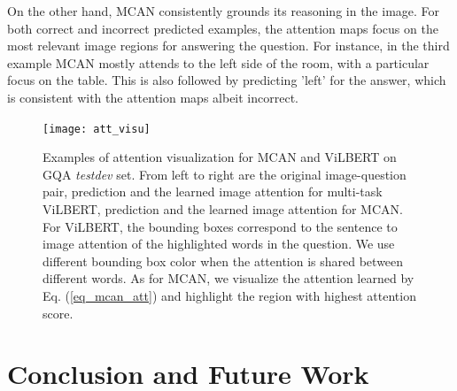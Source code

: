 \documentclass{article}
\begin{document}
On the other hand, MCAN consistently grounds its reasoning in the image. For both correct and incorrect predicted examples, the attention maps focus on the most relevant image regions for answering the question. For instance, in the third example MCAN mostly attends to the left side of the room, with a particular focus on the table. This is also followed by predicting 'left' for the answer, which is consistent with the attention maps albeit incorrect.

\begin{figure}[!ht]
	\centering
	\texttt{[image: att\_visu]}
	\caption{Examples of attention visualization for MCAN and ViLBERT on GQA \textit{testdev} set. From left to right are the original image-question pair, prediction and the learned image attention for multi-task ViLBERT, prediction and the learned image attention for MCAN. For ViLBERT, the bounding boxes correspond to the sentence to image attention of the highlighted words in the question. We use different bounding box color when the attention is shared between different words. As for MCAN, we visualize the attention learned by Eq. (\ref{eq_mcan_att}) and highlight the region with highest attention score.}
	\label{fig:att_visu}
\end{figure}

\section{Conclusion and Future Work}

\pagebreak

\end{document}

